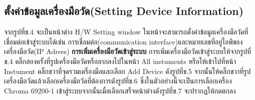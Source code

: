 \subsection{ตั้งค่าข้อมูลเครื่องมือวัด(Setting Device Information)}
จากรูปที่ข.4 จะเป็นหน้าต่าง H/W Setting window ในหน้าจะสามารถตั้งค่าข้อมูลเครื่องมือวัดที่เชื่อมต่อเข้าสู่ระบบได้เช่น การเชื่อมต่อ(communication interface)และหมายเลขที่อยู่ไอพีของเครื่องมือวัด(IP Adress)
\newline
\newline
\textbf{การเพิ่มเครื่องมือวัดเข้าสู่ระบบ}
\newline \hspace*{2cm} 
การเพิ่มเครื่องมือวัดเข้าสู่ระบบให้จากรูปที่ข.4 คลิ๊กสองครั้งที่รูปเครื่องมือวัดหรือลากลงไปในหน้า All instuments หรือให้เข้าไปที่หน้า Instument คลิ๊กขวาที่จุดรวมเครื่องมือและเลือก Add Device 
ดังรูปที่ข.5 จากนั้นให้คลิ๊กขวาที่รูปเครื่องมือวัดแล้วเลือกเครื่องมือวัดที่ต้องการดังรูปที่ข.6 ซึ่งในตัวอย่างนี้จะเป็นการเลือกเครื่อง Chroma 69200-1 เข้าสู่ระบบจากนั้นเมื่อเลือกเสร็จหน้าต่างดังรูปที่ข.7 จะปรากฎให้กดตกลง

